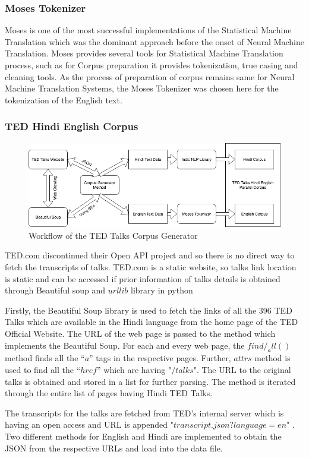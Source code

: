 \subsubsection{Moses Tokenizer}
Moses is one of the most successful implementations of the Statistical Machine Translation which was the dominant approach before the onset of Neural Machine Translation. Moses provides several tools for Statistical Machine Translation process, such as for Corpus preparation it provides tokenization, true casing and cleaning tools. As the process of preparation of corpus remains same for Neural Machine Translation Systems, the Moses Tokenizer was chosen here for the tokenization of the English text. 
\subsubsection{TED Hindi English Corpus}
\begin{figure}
\includegraphics[width=\textwidth]{figures/traindataworkflow.png}
\caption{Workflow of the TED Talks Corpus Generator} \label{fig1}
\end{figure}
TED.com discontinued their Open API project and so there is no direct way to fetch the transcripts of talks. TED.com is a static website, so talks link location is static and can be accessed if prior information of talks details is obtained through Beautiful soup and $urllib$ library in python 

Firstly, the Beautiful Soup library is used to fetch the links of all the 396 TED Talks which are available in the Hindi language from the home page of the TED Official Website. The URL of the web page is passed to the method which implements the Beautiful Soup.  For each and every web page, the $find/_all()$ method finds all the “$a$” tags in the respective pages. Further, $attrs$ method is used to find all the $“href”$ which are having "$/talks$". The URL to the original talks is obtained and stored in a list for further parsing. The method is iterated through the entire list of pages having Hindi TED Talks. 

The transcripts for the talks are fetched from TED’s internal server which is having an open access and URL is appended "$transcript.json?language=en$" . Two different methods for English and Hindi are implemented to obtain the JSON from the respective URLs and load into the data file. 

